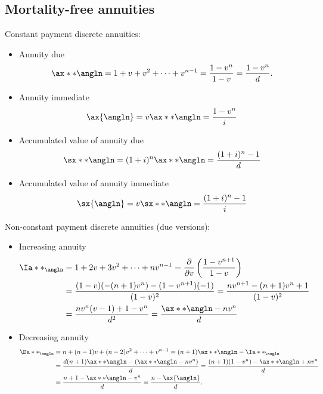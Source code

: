 \subsection{Mortality-free annuities}

Constant payment discrete annuities:
\begin{itemize}
\item Annuity due
\begin{equation*}
\ax**{\angln} = 1 + v + v^2 + \cdots + v^{n - 1} = \frac{1 - v^n}{1 - v} = \frac{1 - v^n}{d}.
\end{equation*}
\item Annuity immediate
\begin{equation*}
\ax{\angln} = v\ax**{\angln} = \frac{1 - v^n}{i}
\end{equation*}
\item Accumulated value of annuity due
\begin{equation*}
\sx**{\angln} = (1 + i)^n\ax**{\angln} = \frac{(1 + i)^n - 1}{d}
\end{equation*}
\item Accumulated value of annuity immediate
\begin{equation*}
\sx{\angln} = v\sx**{\angln} = \frac{(1 + i)^n - 1}{i}
\end{equation*}
\end{itemize}

\newpage
Non-constant payment discrete annuities (due versions):
\begin{itemize}
\item Increasing annuity
\begin{equation*}
\begin{split}
\Ia**_{\angln} &= 1 + 2v + 3v^2 + \cdots + nv^{n - 1} = \frac{\partial}{\partial v}\left(\frac{1 - v^{n + 1}}{1 - v}\right) \\
&= \frac{(1 - v)(-(n + 1)v^n) - (1 - v^{n + 1})(-1)}{(1 - v)^2} = \frac{nv^{n + 1} - (n + 1)v^n + 1}{(1 - v)^2} \\
&= \frac{nv^n(v - 1) + 1 - v^n}{d^2} = \frac{\ax**{\angln} - nv^n}{d}
\end{split}
\end{equation*}
\item Decreasing annuity
\begin{equation*}
\begin{split}
\Da**_{\angln} &= n + (n - 1)v + (n - 2)v^2 + \cdots + v^{n - 1} = (n + 1)\ax**{\angln} - \Ia**_{\angln} \\
&= \frac{d(n + 1)\ax**{\angln} - (\ax**{\angln} - nv^n)}{d} = \frac{(n + 1)(1 - v^n) - \ax**{\angln} + nv^n}{d} \\
&= \frac{n + 1 - \ax**{\angln} - v^n}{d} = \frac{n - \ax{\angln}}{d}.
\end{split}
\end{equation*}
\end{itemize}

